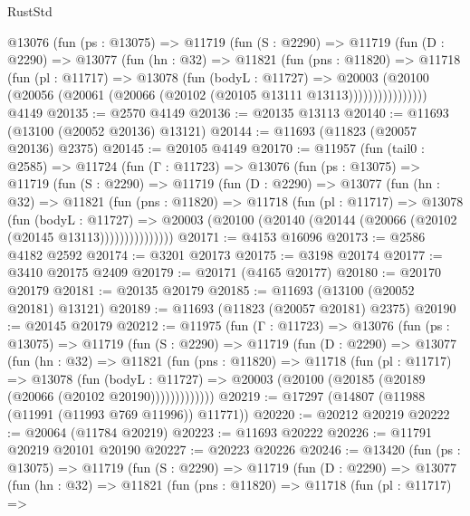 \begin{lexlean}{RustStd}
\begin{coremodule}
        @13076
          (fun (ps : @13075) =>
          @11719
            (fun (S : @2290) =>
            @11719
              (fun (D : @2290) =>
              @13077
                (fun (hn : @32) =>
                @11821
                  (fun (pns : @11820) =>
                  @11718
                    (fun (pl : @11717) =>
                    @13078
                      (fun (bodyL : @11727) =>
                      @20003
                        (@20100
                          (@20056 (@20061 (@20066 (@20102 (@20105 @13111 @13113))))))))))))))))
    @4149
@20135 := @2570 @4149
@20136 := @20135 @13113
@20140 := @11693 (@13100 (@20052 @20136) @13121)
@20144 := @11693 (@11823 (@20057 @20136) @2375)
@20145 := @20105 @4149
@20170 := @11957
    (fun (tail0 : @2585) =>
    @11724
      (fun (Γ : @11723) =>
      @13076
        (fun (ps : @13075) =>
        @11719
          (fun (S : @2290) =>
          @11719
            (fun (D : @2290) =>
            @13077
              (fun (hn : @32) =>
              @11821
                (fun (pns : @11820) =>
                @11718
                  (fun (pl : @11717) =>
                  @13078
                    (fun (bodyL : @11727) =>
                    @20003 (@20100 (@20140 (@20144 (@20066 (@20102 (@20145 @13113)))))))))))))))
@20171 := @4153 @16096
@20173 := @2586 @4182 @2592
@20174 := @3201 @20173
@20175 := @3198 @20174
@20177 := @3410 @20175 @2409
@20179 := @20171 (@4165 @20177)
@20180 := @20170 @20179
@20181 := @20135 @20179
@20185 := @11693 (@13100 (@20052 @20181) @13121)
@20189 := @11693 (@11823 (@20057 @20181) @2375)
@20190 := @20145 @20179
@20212 := @11975
    (fun (Γ : @11723) =>
    @13076
      (fun (ps : @13075) =>
      @11719
        (fun (S : @2290) =>
        @11719
          (fun (D : @2290) =>
          @13077
            (fun (hn : @32) =>
            @11821
              (fun (pns : @11820) =>
              @11718
                (fun (pl : @11717) =>
                @13078
                  (fun (bodyL : @11727) =>
                  @20003 (@20100 (@20185 (@20189 (@20066 (@20102 @20190)))))))))))))
@20219 := @17297 (@14807 (@11988 (@11991 (@11993 @769 @11996)) @11771))
@20220 := @20212 @20219
@20222 := @20064 (@11784 @20219)
@20223 := @11693 @20222
@20226 := @11791 @20219 @20101 @20190
@20227 := @20223 @20226
@20246 := @13420
    (fun (ps : @13075) =>
    @11719
      (fun (S : @2290) =>
      @11719
        (fun (D : @2290) =>
        @13077
          (fun (hn : @32) =>
          @11821
            (fun (pns : @11820) =>
            @11718
              (fun (pl : @11717) =>

\end{coremodule}
\end{lexlean}
